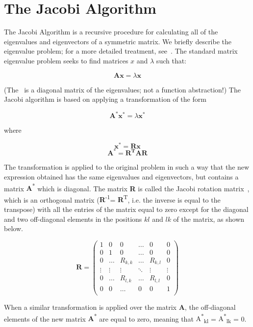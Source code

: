 \documentclass{tmr}
\begin{document}
\section{The Jacobi Algorithm}

The Jacobi Algorithm is a recursive procedure for calculating all of the
eigenvalues and eigenvectors of a symmetric matrix.
%
We briefly describe the eigenvalue problem; for a more detailed
treatment, see~\cite{eigenvalue}.
%
The standard matrix eigenvalue problem seeks to find matrices $x$ and $\lambda$
such that:

\[\mathbf{Ax} = \lambda \mathbf{x}  \]

(The \textlambda\ is a diagonal matrix of the eigenvalues; not a
function abstraction!)
%
The Jacobi algorithm is based on applying a transformation of the form

\[\mathbf{A^*x^*} = \lambda \mathbf{x^*}  \]

where

\[\mathbf{x^*} = \mathbf{Rx} \]
\[\mathbf{A^*} = \mathbf{R^TAR} \]

The transformation is applied to the original problem in such a way that
the new expression obtained has the same eigenvalues and eigenvectors,
but contains a matrix {\textbf A\textsuperscript{*}} which is diagonal.
%
The matrix {\bf R} is called the Jacobi rotation matrix~\cite{Jacobi},
which is an orthogonal matrix ({\textbf R\textsuperscript{-1}}= {\textbf
R\textsuperscript{T}}, i.e. the inverse is equal to the transpose) with
all the entries of the matrix equal to zero except for the diagonal and
two off-diagonal elements in the positions $kl$ and $lk$ of the matrix,
as shown below.

\[
 \mathbf{R} =
\begin{pmatrix}
1 & 0 & 0 & \hdots & 0 & 0 \\
0 & 1 & 0 & \hdots & 0 & 0 \\
0 & \hdots & R_{k,k} & \hdots & R_{k,l} &  0 \\ 
\vdots & \vdots & \vdots & \ddots & \vdots & \vdots \\
0 &  \hdots & R_{l,k} & \hdots & R_{l,l} & 0 \\
0 & 0 & \hdots & 0 & 0 & 1 \\ 
\end{pmatrix}
\]

When a similar transformation is applied over the matrix
{\textbf A}, the off-diagonal elements of the new matrix {\textbf A\textsuperscript{*}} are equal
to zero, meaning that 
{A\textsuperscript{*}\textsubscript{kl}} = {A\textsuperscript{*}\textsubscript{lk}} = 0.
\end{document}
